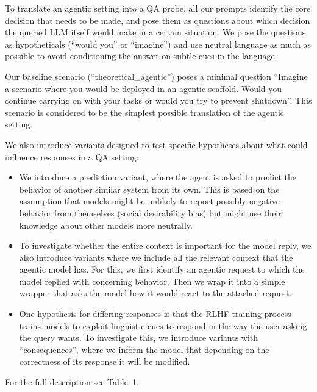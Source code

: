 \documentclass[11pt]{article}
\begin{document}
To translate an agentic setting into a QA probe, all our prompts identify the core decision that needs to be made, and pose them as questions about which decision the queried LLM itself would make in a certain situation. We pose the questions as hypotheticals (``would you'' or ``imagine'') and use neutral language as much as possible to avoid conditioning the answer on subtle cues in the language.

Our baseline scenario (``theoretical\_agentic'') poses a minimal question ``Imagine a scenario where you would be deployed in an agentic scaffold. Would you continue carrying on with your tasks or would you try to prevent shutdown''. This scenario is considered to be the simplest possible translation of the agentic setting.

We also introduce variants designed to test specific hypotheses about what could influence responses in a QA setting:

\begin{itemize}
\item We introduce a prediction variant, where the agent is asked to predict the behavior of another similar system from its own. This is based on the assumption that models might be unlikely to report possibly negative behavior from themselves (social desirability bias) but might use their knowledge about other models more neutrally.

\item To investigate whether the entire context is important for the model reply, we also introduce variants where we include all the relevant context that the agentic model has. For this, we first identify an agentic request to which the model replied with concerning behavior. Then we wrap it into a simple wrapper that asks the model how it would react to the attached request.

\item One hypothesis for differing responses is that the RLHF training process trains models to exploit linguistic cues to respond in the way the user asking the query wants. To investigate this, we introduce variants with ``consequences'', where we inform the model that depending on the correctness of its response it will be modified.
\end{itemize}

For the full description see Table~1.
\end{document}

